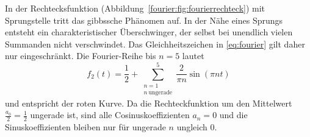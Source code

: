 \begin{beispiel}

In der Rechtecksfunktion (Abbildung~\ref{fourier:fig:fourierrechteck}) mit Sprungstelle tritt das gibbssche Phänomen auf.  
In der Nähe eines Sprungs entsteht ein charakteristischer Überschwinger, der selbst bei unendlich vielen Summanden nicht verschwindet.
Das Gleichheitszeichen in \eqref{eq:fourier} gilt daher nur eingeschränkt.  
Die Fourier-Reihe bis $n=5$ lautet
\begin{equation}
	f_2(t) = \frac{1}{2} + \sum_{\substack{n=1 \\ n\ \text{ungerade}}}^{5} \frac{2}{\pi n} \sin\left( \pi n t \right)
\end{equation}
und entspricht der roten Kurve.  
Da die Rechteckfunktion um den Mittelwert $\frac{a_0}{2}=\frac{1}{2}$ ungerade ist, sind alle Cosinuskoeffizienten $a_n=0$ und die Sinuskoeffizienten bleiben nur für ungerade $n$ ungleich $0$.  

\end{beispiel}






